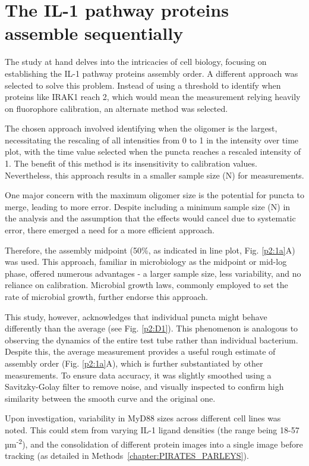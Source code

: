 \section{The IL-1 pathway proteins assemble sequentially}
\label{section:sequential}
The study at hand delves into the intricacies of cell biology, focusing on establishing the IL-1 pathway proteins assembly order. A different approach was selected to solve this problem. Instead of using a threshold to identify when proteins like IRAK1 reach 2\times, which would mean the measurement relying heavily on fluorophore calibration, an alternate method was selected.

The chosen approach involved identifying when the oligomer is the largest, necessitating the rescaling of all intensities from 0 to 1 in the intensity over time plot, with the time value selected when the puncta reaches a rescaled intensity of 1. The benefit of this method is its insensitivity to calibration values. Nevertheless, this approach results in a smaller sample size (N) for measurements.

One major concern with the maximum oligomer size is the potential for puncta to merge, leading to more error. Despite including a minimum sample size (N) in the analysis and the assumption that the effects would cancel due to systematic error, there emerged a need for a more efficient approach.

Therefore, the assembly midpoint (50\%, as indicated in line plot, Fig. \ref{p2:1a}A) was used. This approach, familiar in microbiology as the midpoint or mid-log phase, offered numerous advantages - a larger sample size, less variability, and no reliance on calibration. Microbial growth laws, commonly employed to set the rate of microbial growth, further endorse this approach.

This study, however, acknowledges that individual puncta might behave differently than the average (see Fig. \ref{p2:D1}). This phenomenon is analogous to observing the dynamics of the entire test tube rather than individual bacterium. Despite this, the average measurement provides a useful rough estimate of assembly order (Fig. \ref{p2:1a}A), which is further substantiated by other measurements. To ensure data accuracy, it was slightly smoothed using a Savitzky-Golay filter to remove noise, and visually inspected to confirm high similarity between the smooth curve and the original one.

Upon investigation, variability in MyD88 sizes across different cell lines was noted. This could stem from varying IL-1 ligand densities (the range being 18-57 µm\textsuperscript{-2}), and the consolidation of different protein images into a single image before tracking (as detailed in Methods~\ref{chapter:PIRATES_PARLEYS}).

